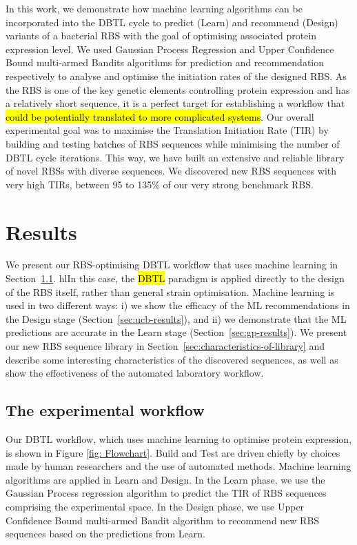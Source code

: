 \documentclass{article}
\begin{document}
In this work, we demonstrate how machine learning algorithms can be incorporated into the DBTL cycle to predict (Learn) and recommend (Design) variants of a bacterial RBS with the goal of optimising associated protein expression level. 
We used Gaussian Process Regression \cite{Rasmussen2004} and Upper Confidence Bound multi-armed Bandits algorithms \cite{desautels2014parallelizing} for prediction and recommendation respectively to analyse and optimise the initiation rates of the designed RBS.
As the RBS is one of the key genetic elements controlling protein expression and has a relatively short sequence, it is a perfect target for establishing a workflow that \hl{could be potentially translated to more complicated systems}.
Our overall experimental goal was to maximise the Translation Initiation Rate (TIR) by building and testing batches of RBS sequences while minimising the number of DBTL cycle iterations.
This way, we have built an extensive and reliable library of novel RBSs with diverse sequences. 
We discovered new RBS sequences with very high TIRs, between 95 to 135\% of our very strong benchmark RBS. 



\section{Results}

We present our RBS-optimising DBTL workflow that uses machine learning in Section~\ref{sec:dbtl-workflow}. 
hl{In this case, the \hl{DBTL} paradigm is applied directly to the design of the RBS itself, rather than general strain optimisation.}
Machine learning is used in two different ways: i) we show the efficacy of the ML recommendations
in the Design stage (Section~\ref{sec:ucb-results}),
and ii) we demonstrate that the ML predictions are accurate in the Learn stage (Section~\ref{sec:gp-results}).
We present our new RBS sequence library in Section~\ref{sec:characteristics-of-library} and describe some interesting
characteristics of the discovered sequences, 
as well as show the effectiveness of the automated laboratory workflow.

\subsection{The experimental workflow}
\label{sec:dbtl-workflow}

Our DBTL workflow, which uses machine learning to optimise protein expression, is shown in Figure \ref{fig: Flowchart}.
Build and Test are driven chiefly by choices made by human researchers and the use of automated methods.
Machine learning algorithms are applied in Learn and Design.
In the Learn phase, we use the Gaussian Process regression algorithm to predict the TIR of RBS sequences comprising the experimental space.
In the Design phase, we use Upper Confidence Bound multi-armed Bandit algorithm to recommend new RBS sequences based on the predictions from Learn.\\
\end{document}
